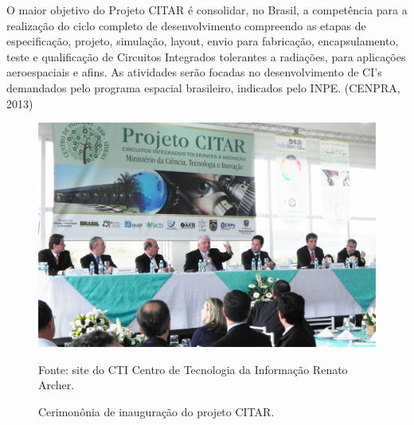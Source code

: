 O maior objetivo do Projeto CITAR é consolidar, no Brasil, a competência para a realização do ciclo completo de desenvolvimento compreendo as etapas de especificação, projeto, simulação, layout, envio para fabricação, encapsulamento, teste e qualificação de Circuitos Integrados tolerantes a radiações, para aplicações aeroespaciais e afins. As atividades serão focadas no desenvolvimento de CI's demandados pelo programa espacial brasileiro, indicados pelo INPE. (\uppercase{Cenpra}, 2013)\let\thefootnote\relax{}



\vfill
\begin{figure}[!htb]
	\centering
	\caption{Cerimonônia de inauguração do projeto CITAR.}
	\includegraphics[scale = 0.5]{imagens/inauguracaoCTI.jpg}
	
	Fonte: site do CTI Centro de Tecnologia da Informação Renato Archer.\footnotemark[1]
	
	\label{Cerimonia}
\end{figure}
\vfill

\let\thefootnote\relax{}



